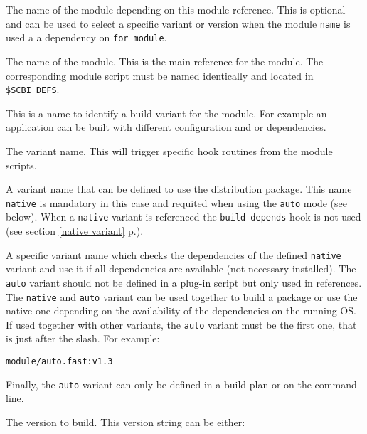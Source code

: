 \documentclass[a4paper,12pt,twoside]{article}
\newcommand{\code}[1]{\texttt{#1}}
\newcommand{\seeref}[1]{see section \ref{#1} p.\pageref{#1}}
\begin{document}
\begin{description}[style=nextline]
	\item[for\_module] The name of the module depending on this module reference. This is optional and can be used to select a specific variant or version when the module \code{name} is used a a dependency on \code{for\_module}.

	\item[name] The name of the module. This is the main reference for the module. The corresponding module script must be named identically and located in \code{\$SCBI\_DEFS}.

	\item[variant] \label{variant}This is a name to identify a build variant for the module. For example an application can be built with different configuration and or dependencies.

	\begin{description}[font=\texttt]
		\item[<ID>] The variant name. This will trigger specific hook routines from the module scripts.

		\item[native] A variant name that can be defined to use the distribution package. This name \code{native} is mandatory in this case and requited when using the \code{auto} mode (see below). When a \code{native} variant is referenced the \code{build-depends} hook is not used (\seeref{native variant}).

		\item[auto] A specific variant name which checks the dependencies of the defined \code{native} variant and use it if all dependencies are available (not necessary installed). The \code{auto} variant should not be defined in a plug-in script but only used in references. The \code{native} and \code{auto} variant can be used together to build a package or use the native one depending on the availability of the dependencies on the running OS. If used together with other variants, the \code{auto} variant must be the first one, that is just after the slash. For example:

		\code{module/auto.fast:v1.3}

		Finally, the \code{auto} variant can only be defined in a build plan or on the command line.
	\end{description}

	\item[version] The version to build. This version string can be either:


\end{description}
\end{document}

